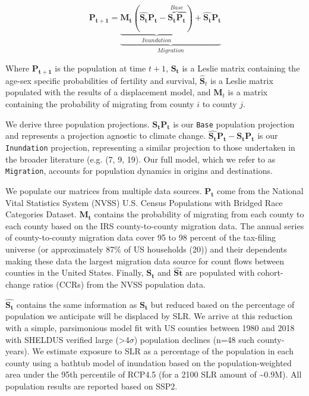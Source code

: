 \documentclass[9pt,twocolumn,twoside,]{pnas-new}
\begin{document}
\[
\mathbf{P_{t+1}} = \underbrace{\underbrace{\mathbf{M_t}(\mathbf{\hat{S_t}}\mathbf{P_t} - \overbrace{\mathbf{S_t}\mathbf{P_t}}^{Base})}_{Inundation} + \mathbf{\hat{S_t}}\mathbf{P_t}}_{Migration}
\tag{1}
\]

Where \(\mathbf{P_{t+1}}\) is the population at time \(t+1\),
\(\mathbf{S_{t}}\) is a Leslie matrix containing the age-sex specific
probabilities of fertility and survival, \(\mathbf{\hat{S}}_t\) is a
Leslie matrix populated with the results of a displacement model, and
\(\mathbf{M}_t\) is a matrix containing the probability of migrating
from county \(i\) to county \(j\).

We derive three population projections. \(\mathbf{S_tP_t}\) is our
\texttt{Base} population projection and represents a projection agnostic
to climate change. \(\mathbf{\hat{S_t}P_t} - \mathbf{S_tP_t}\) is our
\texttt{Inundation} projection, representing a similar projection to
those undertaken in the broader literature (e.g. (7, 9, 19). Our full
model, which we refer to as \texttt{Migration}, accounts for population
dynamics in origins and destinations.

We populate our matrices from multiple data sources. \(\mathbf{P_t}\)
come from the National Vital Statistics System (NVSS) U.S. Census
Populations with Bridged Race Categories Dataset. \(\mathbf{M_t}\)
contains the probability of migrating from each county to each county
based on the IRS county-to-county migration data. The annual series of
county-to-county migration data cover 95 to 98 percent of the tax-filing
universe (or approximately 87\% of US households (20)) and their
dependents making these data the largest migration data source for count
flows between counties in the United States. Finally, \(\mathbf{S_t}\)
and \(\mathbf{\hat{St}}\) are populated with cohort-change ratios (CCRs)
from the NVSS population data.

\(\mathbf{\hat{S_t}}\) contains the same information as \(\mathbf{S_t}\)
but reduced based on the percentage of population we anticipate will be
displaced by SLR. We arrive at this reduction with a simple,
parsimonious model fit with US counties between 1980 and 2018 with
SHELDUS verified large (\textgreater4\(\sigma\)) population declines
(n=48 such county-years). We estimate exposure to SLR as a percentage of
the population in each county using a bathtub model of inundation based
on the population-weighted area under the 95th percentile of RCP4.5 (for
a 2100 SLR amount of \textasciitilde0.9M). All population results are
reported based on SSP2.
\end{document}
